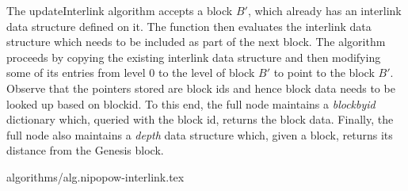 The updateInterlink algorithm accepts a block $B'$, which already has an
interlink data structure defined on it. The function then evaluates the
interlink data structure which needs to be included as part of the next block.
The algorithm proceeds by copying the existing interlink data structure and
then modifying some of its entries from level $0$ to the level of block $B'$ to
point to the block $B'$. Observe that the pointers stored are block ids and
hence block data needs to be looked up based on blockid. To this end, the full
node maintains a \textit{blockbyid} dictionary which, queried with the block
id, returns the block data. Finally, the full node also maintains a
\textit{depth} data structure which, given a block, returns its distance from
the Genesis block.

{algorithms/alg.nipopow-interlink.tex}
